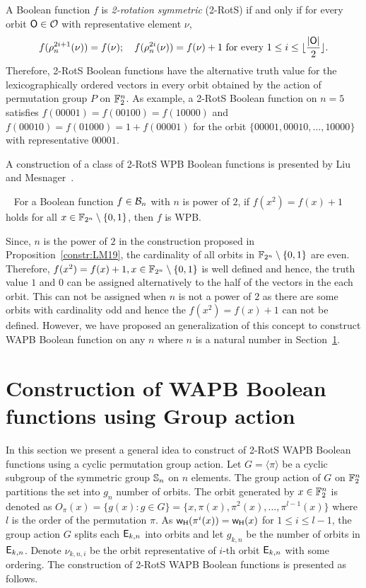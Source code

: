 \documentclass{llncs}
\begin{document}
A Boolean function $f$ is {\em 2-rotation symmetric} (2-RotS) if and only if 
for every orbit $\mathsf{O} \in \mathcal{O}$ with representative element $\nu$,
$$f(\rho_n^{2i+1}(\nu)) = f(\nu);~~~ f(\rho_n^{2i}(\nu)) = f(\nu)+1 \text{ for every } 1 \leq i \leq \lfloor\frac{|\mathsf{O}|}{2}\rfloor.$$ 
Therefore, 2-RotS Boolean functions have the alternative truth value for the lexicographically ordered vectors in every orbit obtained by the action of permutation group $P$ on $\mathbb{F}_2^n$. 
As example, a 2-RotS Boolean function on $n = 5$ satisfies $f(00001) = f(00100) = f(10000)$ and $f(00010) = f(01000) = 1+f(00001)$ for the orbit $\{00001, 00010, \ldots, 10000\}$ with representative  $00001$.

A construction of a class of 2-RotS WPB Boolean functions is presented by Liu and Mesnager~\cite{DCC:LiuMes19}.
\begin{proposition} \cite{DCC:LiuMes19}~\label{constr:LM19} For a Boolean function $f \in \mathcal{B}_n$ with $n$ is power of $2$, if $f(x^2)=f(x)+1$ holds for all $x \in \mathbb{F}_{2^n} \setminus \{0,1\}$, then $f$ is WPB.  
\end{proposition}
Since, $n$ is the power of $2$ in the construction proposed in Proposition~\ref{constr:LM19}, the cardinality of all orbits in $\mathbb{F}_{2^n} \setminus \{0,1\}$ are even. Therefore, $f(x^2)=f(x)+1, x \in \mathbb{F}_{2^n} \setminus \{0,1\}$ is well defined and hence, the truth value $1$ and $0$ can be assigned alternatively to the half of the vectors in the each orbit. This can not be assigned when $n$ is not a power of $2$ as there are some orbits with cardinality odd and hence the $f(x^2) = f(x)+1$ can not be defined. However, we have proposed an generalization of this concept to construct WAPB Boolean function on any $n$ where $n$ is a natural number in Section~\ref{sec:GA}. 

\section{Construction of WAPB Boolean functions using Group action}\label{sec:GA}
In this section we present a general idea to construct of 2-RotS WAPB Boolean functions using a cyclic permutation group action. Let $G = \langle \pi \rangle$ be a cyclic subgroup of the symmetric group $\mathbb{S}_n$ on $n$ elements. The group action of $G$ on $\mathbb{F}_2^n$ partitions the set into $g_n$ number of orbits. The orbit generated by $x \in \mathbb{F}_2^n$ is denoted as $O_\pi(x) = \{g(x) : g \in G\} = \{x , \pi(x), \pi^2 (x),\ldots ,\pi^{l-1}(x)\}$ where $l$ is the order of the permutation $\pi$. As $\mathsf{w_H}(\pi^{i}(x)) = \mathsf{w_H}(x)$ for $1 \leq i \leq {l-1}$, the group action $G$ splits each $\mathsf{E}_{k,n}$ into orbits and let $g_{k,n}$ be the number of orbits in $\mathsf{E}_{k,n}$.
Denote $\nu_{k,n,i}$ be the orbit representative of $i$-th orbit $\mathsf{E}_{k,n}$ with some ordering.
The construction of 2-RotS WAPB Boolean functions is presented as follows.
\end{document}
